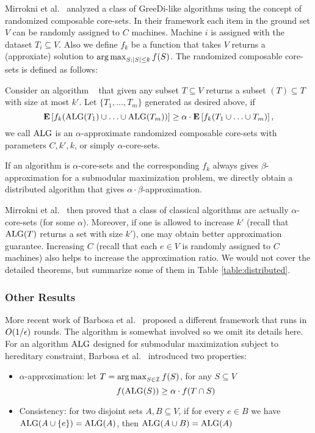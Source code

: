 Mirrokni et al.\ \cite{MZ15} analyzed a class of {\sc GreeDi}-like algorithms using the concept of randomized composable core-sets. In their framework each item in the ground set $V$ can be randomly assigned to $C$ machines. Machine $i$ is assigned with the dataset $T_i \subseteq V$. Also we define $f_k$ be a function that takes $V$ returns a (approxiate) solution to $\operatorname*{arg\,max}_{S:|S|\leq k} f(S)$. The randomized composable core-sets is defined as follows:
\begin{definition}[Informal]
  \label{def:core-sets}
  Consider an algorithm \alg~ that given any subset $T\subseteq V$ returns a subset \alg$(T)\subseteq T$ with size at most $k'$. Let $\{T_1, \ldots, T_m\}$ generated as desired above, if 
$$\mathbf{E}\left[f_k(\text{ALG}(T_1)\cup\ldots\cup\text{ALG}(T_m))\right] \geq \alpha \cdot \mathbf{E}\left[f_k(T_1\cup\ldots\cup T_m)\right],$$
we call $\text{ALG}$ is an $\alpha$-approximate randomized composable core-sets with parameters $C, k', k$, or simply $\alpha$-core-sets.
\end{definition}
If an algorithm is $\alpha$-core-sets and the corresponding $f_k$  always gives $\beta$-approximation for a submodular maximization problem, we directly obtain a distributed algorithm that gives $\alpha\cdot\beta$-approximation.



Mirrokni et al.\ \cite{MZ15} then proved that a class of classical algorithms are actually $\alpha$-core-sets (for some $\alpha$). Moreover, if one is allowed to increase $k'$ (recall that $\text{ALG}(T)$ returns a set with size $k'$), one may obtain better approximation guarantee. Increasing $C$ (recall that each $e\in V$ is randomly assigned to $C$ machines) also helps to increase the approximation ratio. We would not cover the detailed theorems, but summarize some of them in Table \ref{table:distributed}.

\subsubsection{Other Results}
More recent work of Barbosa et al.\ \cite{BAN+2015new} proposed a different framework that runs in $O(1/\epsilon)$ rounds. The algorithm is somewhat involved so we omit its details here. For an algorithm $\text{ALG}$ designed for submodular maximization subject to hereditary constraint, Barbosa et al.\ \cite{BAN+2015new} introduced two properties:
\begin{itemize}
\item $\alpha$-approximation: let $T = \operatorname*{arg\,max}_{S\in\mathcal{I}} f(S)$, for any $S \subseteq V$
$$f(\text{ALG}(S)) \geq \alpha \cdot f(T\cap S)$$
\item Consistency: for two disjoint sets $A, B \subseteq V$, if for every $e\in B$ we have $\text{ALG}(A\cup\{e\}) = \text{ALG}(A)$, then $\text{ALG}(A\cup B) = \text{ALG}(A)$
\end{itemize}


